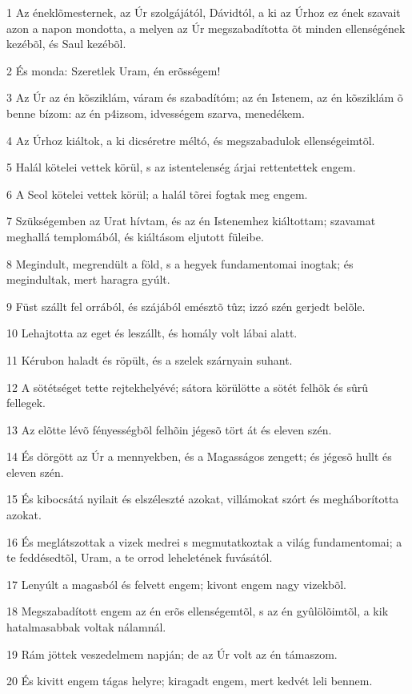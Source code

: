 \par 1 Az éneklõmesternek, az Úr szolgájától, Dávidtól, a ki az Úrhoz ez ének szavait azon a napon mondotta, a melyen az Úr megszabadította õt minden ellenségének kezébõl, és Saul kezébõl.
\par 2 És monda: Szeretlek Uram, én erõsségem!
\par 3 Az Úr az én kõsziklám, váram és szabadítóm; az én Istenem, az én kõsziklám õ benne bízom: az én p4izsom, idvességem szarva, menedékem.
\par 4 Az Úrhoz kiáltok, a ki dicséretre méltó, és megszabadulok ellenségeimtõl.
\par 5 Halál kötelei vettek körül, s az istentelenség árjai rettentettek engem.
\par 6 A Seol kötelei vettek körül; a halál tõrei fogtak meg engem.
\par 7 Szükségemben az Urat hívtam, és az én Istenemhez kiáltottam; szavamat meghallá templomából, és kiáltásom eljutott füleibe.
\par 8 Megindult, megrendült a föld, s a hegyek fundamentomai inogtak; és megindultak, mert haragra gyúlt.
\par 9 Füst szállt fel orrából, és szájából emésztõ tûz; izzó szén gerjedt belõle.
\par 10 Lehajtotta az eget és leszállt, és homály volt lábai alatt.
\par 11 Kérubon haladt és röpült, és a szelek szárnyain suhant.
\par 12 A sötétséget tette rejtekhelyévé; sátora körülötte a sötét felhõk és sûrû fellegek.
\par 13 Az elõtte lévõ fényességbõl felhõin jégesõ tört át és eleven szén.
\par 14 És dörgött az Úr a mennyekben, és a Magasságos zengett; és jégesõ hullt és eleven szén.
\par 15 És kibocsátá nyilait és elszéleszté azokat, villámokat szórt és megháborította azokat.
\par 16 És meglátszottak a vizek medrei s megmutatkoztak a világ fundamentomai; a te feddésedtõl, Uram, a te orrod leheletének fuvásától.
\par 17 Lenyúlt a magasból és felvett engem; kivont engem nagy vizekbõl.
\par 18 Megszabadított engem az én erõs ellenségemtõl, s az én gyûlölõimtõl, a kik hatalmasabbak voltak nálamnál.
\par 19 Rám jöttek veszedelmem napján; de az Úr volt az én támaszom.
\par 20 És kivitt engem tágas helyre; kiragadt engem, mert kedvét leli bennem.
